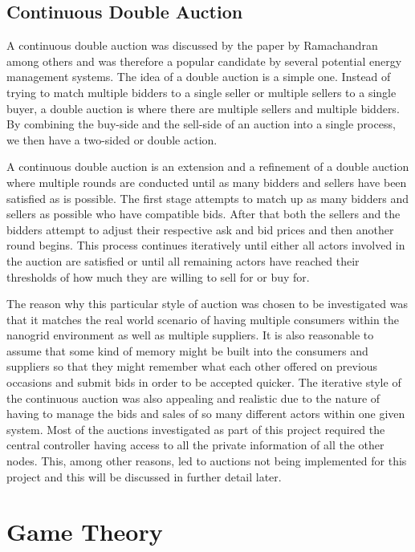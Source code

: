 \documentclass[a4paper, notitlepage]{report}
\begin{document}
\section{Continuous Double Auction}
\label{sec:org168fbc7}
A continuous double auction was discussed by the paper by Ramachandran
\cite{ramachandran2011intelligent} among others and was therefore a popular
candidate by several potential energy management systems. The idea of a double
auction is a simple one. Instead of trying to match multiple bidders to a single
seller or multiple sellers to a single buyer, a double auction is where there
are multiple sellers and multiple bidders. By combining the buy-side and the
sell-side of an auction into a single process, we then have a two-sided or
double action.

A continuous double auction is an extension and a refinement of a double auction
where multiple rounds are conducted until as many bidders and sellers have been
satisfied as is possible. The first stage attempts to match up as many bidders
and sellers as possible who have compatible bids. After that both the sellers
and the bidders attempt to adjust their respective ask and bid prices and then
another round begins. This process continues iteratively until either all actors
involved in the auction are satisfied or until all remaining actors have reached
their thresholds of how much they are willing to sell for or buy for.

The reason why this particular style of auction was chosen to be investigated
was that it matches the real world scenario of having multiple consumers within
the nanogrid environment as well as multiple suppliers. It is also reasonable to
assume that some kind of memory might be built into the consumers and suppliers
so that they might remember what each other offered on previous occasions and
submit bids in order to be accepted quicker. The iterative style of the
continuous auction was also appealing and realistic due to the nature of having
to manage the bids and sales of so many different actors within one given
system. Most of the auctions investigated as part of this project required the
central controller having access to all the private information of all the other
nodes. This, among other reasons, led to auctions not being implemented for this
project and this will be discussed in further detail later.
\chapter{Game Theory}
\label{sec:org829d462}
\end{document}
